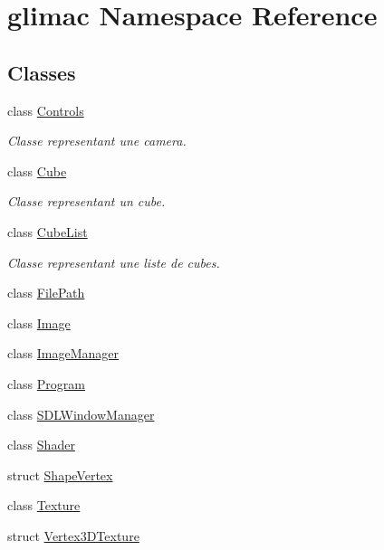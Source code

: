 \hypertarget{namespaceglimac}{}\section{glimac Namespace Reference}
\label{namespaceglimac}
\subsection*{Classes}
\begin{DoxyCompactItemize}
\item 
class \hyperlink{classglimac_1_1Controls}{Controls}
\begin{DoxyCompactList}\small\item\em Classe representant une camera. \end{DoxyCompactList}\item 
class \hyperlink{classglimac_1_1Cube}{Cube}
\begin{DoxyCompactList}\small\item\em Classe representant un cube. \end{DoxyCompactList}\item 
class \hyperlink{classglimac_1_1CubeList}{Cube\+List}
\begin{DoxyCompactList}\small\item\em Classe representant une liste de cubes. \end{DoxyCompactList}\item 
class \hyperlink{classglimac_1_1FilePath}{File\+Path}
\item 
class \hyperlink{classglimac_1_1Image}{Image}
\item 
class \hyperlink{classglimac_1_1ImageManager}{Image\+Manager}
\item 
class \hyperlink{classglimac_1_1Program}{Program}
\item 
class \hyperlink{classglimac_1_1SDLWindowManager}{S\+D\+L\+Window\+Manager}
\item 
class \hyperlink{classglimac_1_1Shader}{Shader}
\item 
struct \hyperlink{structglimac_1_1ShapeVertex}{Shape\+Vertex}
\item 
class \hyperlink{classglimac_1_1Texture}{Texture}
\item 
struct \hyperlink{structglimac_1_1Vertex3DTexture}{Vertex3\+D\+Texture}
\end{DoxyCompactItemize}
